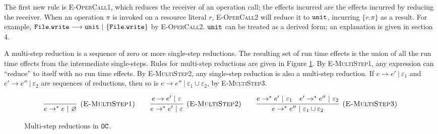 The first new rule is \textsc{E-OperCall1}, which reduces the receiver of an operation call; the effects incurred are the effects incurred by reducing the receiver.  When an operation $\pi$ is invoked on a resource literal $r$, \textsc{E-OperCall2} will reduce it to $\mathtt{unit}$,
incurring $\{ r.\pi \}$ as a result. For example, $\mathtt{File.write} \longrightarrow \mathtt{unit}~|~\{ \mathtt{File.write} \}$ by \textsc{E-OperCall2}. $\mathtt{unit}$ can be treated as a derived form; an explanation is given in section 4.

A multi-step reduction is a sequence of zero
or more single-step reductions. The resulting set of run time effects is the union of all the run time effects from the intermediate single-steps. Rules for multi-step reductions are given in Figure \ref{fig:opercalc_multistep_defn}. By \textsc{E-MultiStep1}, any expression can ``reduce'' to itself with no run time effects. By \textsc{E-MultiStep2}, any single-step reduction is also a multi-step reduction. If $e \longrightarrow e'~|~\varepsilon_1$ and $e' \longrightarrow e''~|~\varepsilon_2$ are sequences of reductions, then so is $e \longrightarrow e''~|~\varepsilon_1 \cup \varepsilon_2$, by \textsc{E-MultiStep3}.

\begin{figure}[h]

\noindent
{}

\[
\begin{array}{c}

\infer[\textsc{(E-MultiStep1)}]
	{ e \rightarrow^{*}  e~|~\varnothing}
	{}
	\hspace{5ex}
\infer[\textsc{(E-MultiStep2)}]
	{ e \rightarrow^{*}  e'~|~\varepsilon}
	{ e \rightarrow  e'~|~\varepsilon}
	\hspace{5ex}
\infer[\textsc{(E-MultiStep3)}]
	{ e \rightarrow^{*}  e''~|~\varepsilon_1 \cup \varepsilon_2}
	{ e \rightarrow^{*}  e'~|~\varepsilon_1 &  e' \rightarrow^{*}  e''~|~\varepsilon_2}
\end{array}
\]

\vspace{-7pt}
\caption{Multi-step reductions in $\mathtt{OC}$.}
\label{fig:opercalc_multistep_defn}
\end{figure}

